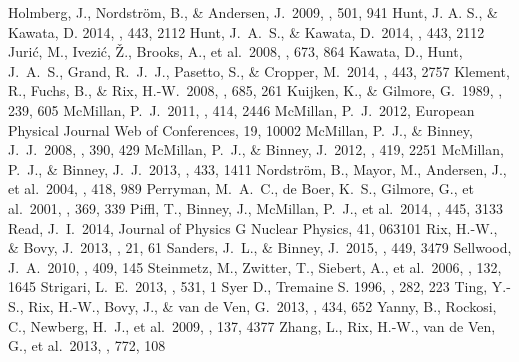 \documentclass[iop,revtex4]{emulateapj}
\begin{document}
\begin{thebibliography}{}
 Holmberg, J., Nordstr{\"o}m, B., \& Andersen, J.\ 2009, \aap, 501, 941 
 Hunt, J. A. S., \& Kawata, D. 2014, \mnras, 443, 2112
 Hunt, J.~A.~S., \& Kawata, D.\ 2014, \mnras, 443, 2112 
 Juri{\'c}, M., Ivezi{\'c}, {\v Z}., Brooks, A., et al.\ 2008, \apj, 673, 864 
 Kawata, D., Hunt, J.~A.~S., Grand, R.~J.~J., Pasetto, S., \& Cropper, M.\ 2014, \mnras, 443, 2757 
 Klement, R., Fuchs, B., \& Rix, H.-W.\ 2008, \apj, 685, 261 
 Kuijken, K., \& Gilmore, G.\ 1989, \mnras, 239, 605 
 McMillan, P.~J.\ 2011, \mnras, 414, 2446 %
 McMillan, P.~J.\ 2012, European Physical Journal Web of Conferences, 19, 10002 
 McMillan, P.~J., \& Binney, J.~J.\ 2008, \mnras, 390, 429 
 McMillan, P.~J., \& Binney, J.\ 2012, \mnras, 419, 2251 
 McMillan, P.~J., \& Binney, J.~J.\ 2013, \mnras, 433, 1411 
 Nordstr{\"o}m, B., Mayor, M., Andersen, J., et al.\ 2004, \aap, 418, 989 
 Perryman, M.~A.~C., de Boer, K.~S., Gilmore, G., et al.\ 2001, \aap, 369, 339 
 Piffl, T., Binney, J., McMillan, P.~J., et al.\ 2014, \mnras, 445, 3133
 Read, J.~I.\ 2014, Journal of Physics G Nuclear Physics, 41, 063101 
 Rix, H.-W., \& Bovy, J.\ 2013, \aapr, 21, 61 %
 Sanders, J.~L., \& Binney, J.\ 2015, \mnras, 449, 3479
 Sellwood, J.~A.\ 2010, \mnras, 409, 145 
 Steinmetz, M., Zwitter, T., Siebert, A., et al.\ 2006, \aj, 132, 1645 
 Strigari, L.~E.\ 2013, \physrep, 531, 1 
 Syer D., Tremaine S. 1996, \mnras, 282, 223
 Ting, Y.-S., Rix, H.-W., Bovy, J., \& van de Ven, G.\ 2013, \mnras, 434, 652
 Yanny, B., Rockosi, C., Newberg, H.~J., et al.\ 2009, \aj, 137, 4377 
 Zhang, L., Rix, H.-W., van de Ven, G., et al.\ 2013, \apj, 772, 108
\end{thebibliography}
\end{document}
